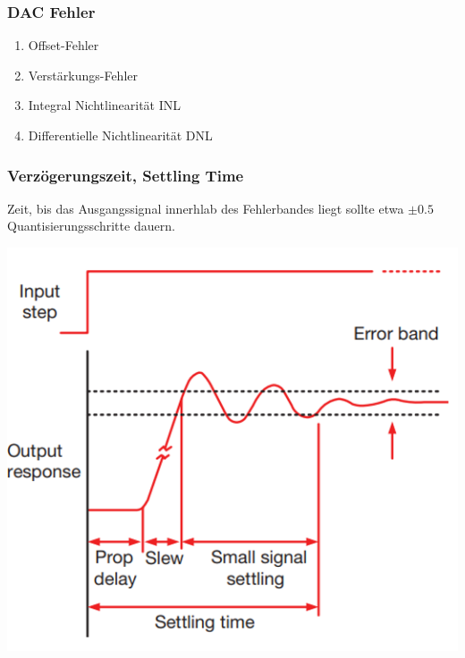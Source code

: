 \subsubsection{DAC Fehler}
\begin{enumerate}[nosep]
	\item Offset-Fehler
	\item Verstärkungs-Fehler
	\item Integral Nichtlinearität INL
	\item Differentielle Nichtlinearität DNL
\end{enumerate}

\subsubsection{Verzögerungszeit, Settling Time}
Zeit, bis das Ausgangssignal innerhlab des Fehlerbandes liegt sollte etwa $\pm0.5$ Quantisierungsschritte dauern.
\begin{center}
	\includegraphics[width=0.5\columnwidth]{Images/settling_imte}
\end{center}



